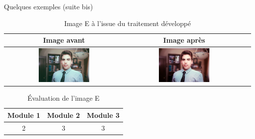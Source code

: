 \documentclass{beamer}
\begin{document}
\begin{frame}{Quelques exemples (suite bis)}
\begin{table}
\centering
\begin{tabular}{|c|c|c|}	
\hline \textbf{Image avant}  &  \textbf{Image après}  \\ \hline 
\includegraphics[width=0.45\textwidth]{Resultats/pe_avant} & \includegraphics[width=0.45\textwidth]{Resultats/pe_apres} \\ \hline   
\end{tabular}
\caption{Image E à l'issue du traitement développé}
\end{table}

\begin{table}[htbp]
\centering
\begin{tabular}{|c|c|c|}
\hline
Module 1 & Module 2 & Module 3\\ \hline
2 & 3 & 3\\ \hline
\end{tabular}
\caption{Évaluation de l'image E}
\end{table}
\end{frame}
\end{document}
